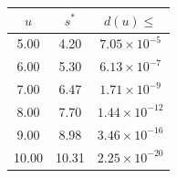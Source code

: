 \begin{tabular}{@{}ccc@{}}
\toprule
$u$ & $s^{*}$ & $d(u)\le$\\
\midrule
5.00 & 4.20 & $7.05\times10^{-5}$\\
6.00 & 5.30 & $6.13\times10^{-7}$\\
7.00 & 6.47 & $1.71\times10^{-9}$\\
8.00 & 7.70 & $1.44\times10^{-12}$\\
9.00 & 8.98 & $3.46\times10^{-16}$\\
10.00 & 10.31 & $2.25\times10^{-20}$\\
\bottomrule
\end{tabular}
